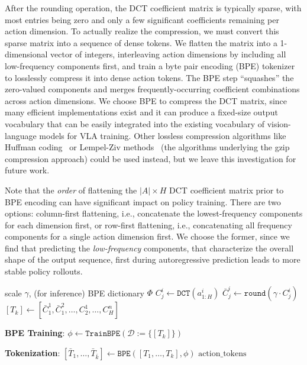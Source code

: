 After the rounding operation, the DCT coefficient matrix is typically sparse, with most entries being zero and only a few significant coefficients remaining per action dimension. To actually realize the compression, we must convert this sparse matrix into a sequence of dense tokens. We flatten the matrix into a 1-dimensional vector of integers, interleaving action dimensions by including all low-frequency components first, and train a byte pair encoding (BPE) tokenizer~\citep{gage1994new} to losslessly compress it into dense action tokens. The BPE step ``squashes'' the zero-valued components and merges frequently-occurring coefficient combinations across action dimensions. We choose BPE to compress the DCT matrix, since many efficient implementations exist and it can produce a fixed-size output vocabulary that can be easily integrated into the existing vocabulary of vision-language models for VLA training. Other lossless compression algorithms like Huffman coding~\citep{huffmancode} or Lempel-Ziv methods~\citep{lempelziv} (the algorithms underlying the gzip compression approach) could be used instead, but we leave this investigation for future work.

Note that the \emph{order} of flattening the $\vert A \vert \times H$ DCT coefficient matrix prior to BPE encoding can have significant impact on policy training. There are two options: column-first flattening, i.e., concatenate the lowest-frequency components for each dimension first, or row-first flattening, i.e., concatenating all frequency components for a single action dimension first. We choose the former, since we find that predicting the \emph{low-frequency} components, that characterize the overall shape of the output sequence, first during autoregressive prediction leads to more stable policy rollouts.

\begin{algorithm}[t]

\caption{\ModelAcronym~Tokenizer}
\label{alg:fast}
\begin{algorithmic}
\Require scale $\gamma$, (for inference) BPE dictionary $\Phi$
    \State $C^i_{j} \gets \texttt{DCT}\left(a^{i}_{1:H}\right)$ 
    \State $\bar C^i_{j} \gets \texttt{round}\left(\gamma \cdot C^i_{j}\right)$ 
    \State $\left[T_k\right] \gets \left[\bar C^1_1, \bar C^2_1, \dots, C^1_2, \dots, C^n_H\right]$ 

\noindent \textbf{BPE Training}:
    \State $\phi \gets \texttt{TrainBPE}(\mathcal{D} := \{[T_k]\})$

\noindent \textbf{Tokenization}:
    \State $\left[{\bar T}_1, \dots, {\bar T}_{\bar k}\right] \gets \texttt{BPE}\left([T_1, \dots, T_k], \phi\right)$
    \State \Return $\text{action\_tokens}$
\EndProcedure
\end{algorithmic}
\end{algorithm}

